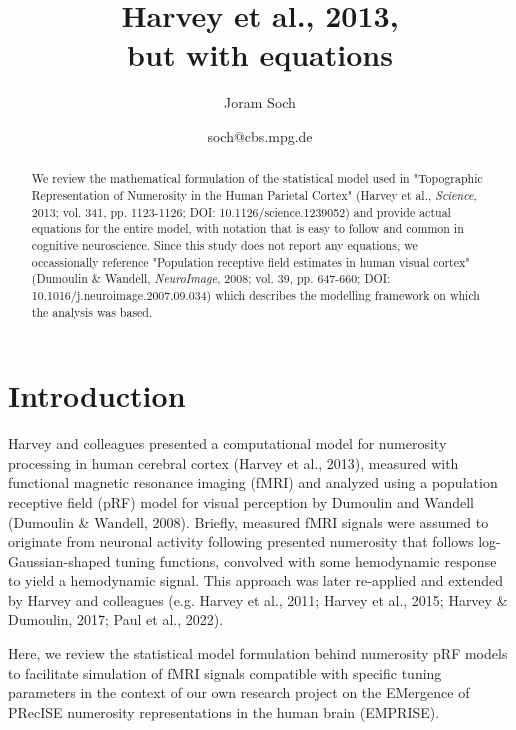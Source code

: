 \documentclass[a4paper,12pt]{article}
\title{Harvey et al., 2013, \\ but with equations}
\author{Joram Soch}
\date{soch@cbs.mpg.de}
\begin{document}
	

\setcounter{page}{0}
\maketitle


\begin{abstract}
\noindent
We review the mathematical formulation of the statistical model used in "Topographic Representation of Numerosity in the Human Parietal Cortex" (Harvey et al., \textit{Science}, 2013; vol. 341, pp. 1123-1126; DOI: 10.1126/science.1239052) and provide actual equations for the entire model, with notation that is easy to follow and common in cognitive neuroscience. Since this study does not report any equations, we occassionally reference "Population receptive field estimates in human visual cortex" (Dumoulin \& Wandell, \textit{NeuroImage}, 2008; vol. 39, pp. 647-660; DOI: 10.1016/j.neuroimage.2007.09.034) which describes the modelling framework on which the analysis was based.
\end{abstract}


\vspace{1em}
\tableofcontents


\pagebreak
\section{Introduction} \label{sec:Intro}

Harvey and colleagues presented a computational model for numerosity processing in human cerebral cortex (Harvey et al., 2013), measured with functional magnetic resonance imaging (fMRI) and analyzed using a population receptive field (pRF) model for visual perception by Dumoulin and Wandell (Dumoulin \& Wandell, 2008). Briefly, measured fMRI signals were assumed to originate from neuronal activity following presented numerosity that follows log-Gaussian-shaped tuning functions, convolved with some hemodynamic response to yield a hemodynamic signal. This approach was later re-applied and extended by Harvey and colleagues (e.g. Harvey et al., 2011; Harvey et al., 2015; Harvey \& Dumoulin, 2017; Paul et al., 2022).

Here, we review the statistical model formulation behind numerosity pRF models to facilitate simulation of fMRI signals compatible with specific tuning parameters in the context of our own research project on the EMergence of PRecISE numerosity representations in the human brain (EMPRISE).
\end{document}
